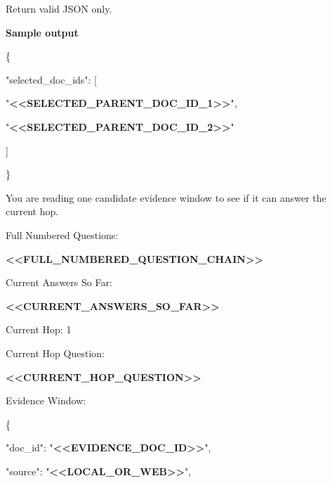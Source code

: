 \begin{tcolorbox}
\begin{scriptsize}
Return valid JSON only.\par
\medskip
\normalfont\textbf{Sample output}\par
\ttfamily
\{\par
  "selected\_doc\_ids": [\par
    "\textcolor{my-green}{\textbf{\textless{}\textless{}SELECTED\_PARENT\_DOC\_ID\_1\textgreater{}\textgreater{}}}",\par
    "\textcolor{my-green}{\textbf{\textless{}\textless{}SELECTED\_PARENT\_DOC\_ID\_2\textgreater{}\textgreater{}}}"\par
  ]\par
\}\par
\end{scriptsize}
\end{tcolorbox}

\begin{tcolorbox}[colback=white, colframe=my-green, coltitle=black, parskip=5mm, title=\textbf{Document Read with Sample Output}, halign=flush left, enhanced, breakable, skin first=enhanced, skin middle=enhanced, skin last=enhanced]
\begin{scriptsize}
\ttfamily
\setlength{\parindent}{0pt}
You are reading one candidate evidence window to see if it can answer the current hop.\par
\mbox{}\par
Full Numbered Questions:\par
\textcolor{my-green}{\textbf{\textless{}\textless{}FULL\_NUMBERED\_QUESTION\_CHAIN\textgreater{}\textgreater{}}}\par
\mbox{}\par
Current Answers So Far:\par
\textcolor{my-green}{\textbf{\textless{}\textless{}CURRENT\_ANSWERS\_SO\_FAR\textgreater{}\textgreater{}}}\par
\mbox{}\par
Current Hop: 1\par
Current Hop Question:\par
\textcolor{my-green}{\textbf{\textless{}\textless{}CURRENT\_HOP\_QUESTION\textgreater{}\textgreater{}}}\par
\mbox{}\par
Evidence Window:\par
\{\par
  "doc\_id": "\textcolor{my-green}{\textbf{\textless{}\textless{}EVIDENCE\_DOC\_ID\textgreater{}\textgreater{}}}",\par
  "source": "\textcolor{my-green}{\textbf{\textless{}\textless{}LOCAL\_OR\_WEB\textgreater{}\textgreater{}}}",\par

\end{scriptsize}
\end{tcolorbox}
